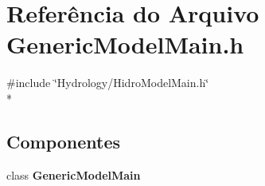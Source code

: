 \section{Referência do Arquivo Generic\+Model\+Main.\+h}
\label{_generic_model_main_8h}
{\ttfamily \#include \char`\"{}Hydrology/\+Hidro\+Model\+Main.\+h\char`\"{}}\\*
\subsection*{Componentes}
\begin{DoxyCompactItemize}
\item 
class {\bf Generic\+Model\+Main}
\end{DoxyCompactItemize}
